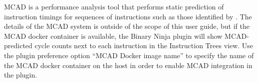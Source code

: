 MCAD is a performance analysis tool that performs static prediction of instruction timings for sequences of instructions such as those identified by \pate{}.
The details of the MCAD system is outside of the scope of this user guide, but if the MCAD docker container is available, the \pate{} Binary Ninja plugin will show MCAD-predicted cycle counts next to each instruction in the Instruction Trees view.
Use the \pate{} plugin preference option ``MCAD Docker image name'' to specify the name of the MCAD docker container on the host in order to enable MCAD integration in the \pate{} plugin.
